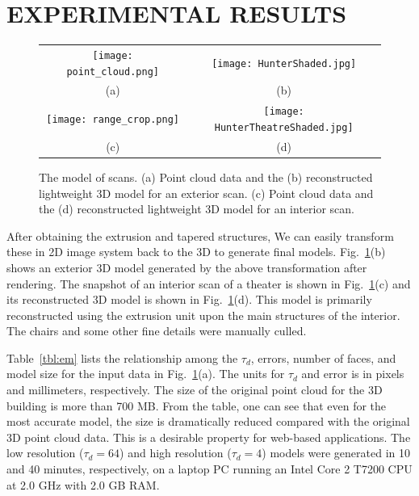 \documentclass{article}
\newcommand{\Tbl}[1]{Table~\ref{tbl:#1}}
\newcommand{\Figa}[1]{Fig.~\ref{fig:#1}(a)}
\newcommand{\Figb}[1]{Fig.~\ref{fig:#1}(b)}
\newcommand{\Figc}[1]{Fig.~\ref{fig:#1}(c)}
\newcommand{\Figd}[1]{Fig.~\ref{fig:#1}(d)}
\begin{document}
\section{EXPERIMENTAL RESULTS}
\label{sec:IR_OUT}

\begin{figure}[htbp]
\begin{center}
\begin{tabular}{cc}
\texttt{[image: point\_cloud.png]} &
\texttt{[image: HunterShaded.jpg]} \\
(a) & (b) \\
\texttt{[image: range\_crop.png]} &
\texttt{[image: HunterTheatreShaded.jpg]} \\
(c) & (d)
\end{tabular}
\end{center}
\caption{The model of scans. (a) Point cloud data and the
(b) reconstructed lightweight 3D model for an exterior scan.
(c) Point cloud data and the
(d) reconstructed lightweight 3D model for an interior scan.}
\label{fig:IN}
\end{figure}

After obtaining the extrusion and tapered structures, 
We can easily transform these in 2D image system back to the 3D to generate final models.
\Figb{IN} shows an exterior 3D model generated by the above
transformation after rendering.
The snapshot of an interior scan of a theater is shown in \Figc{IN}
and its reconstructed 3D model is shown in \Figd{IN}.
This model is primarily reconstructed using the extrusion unit
upon the main structures of the interior.
The chairs and some other fine details were manually culled.

\Tbl{em} lists the relationship among the $\tau_d$, errors,
number of faces, and model size for the input data in \Figa{IN}.
The units for $\tau_d$ and error is in pixels and millimeters, respectively.
The size of the original point cloud for the 3D building is more than 700 MB.
From the table, one can see that even for the most accurate model, the size
is dramatically reduced compared with the original 3D point cloud data.
This is a desirable property for web-based applications.
The low resolution ($\tau_d = 64$) and high resolution ($\tau_d = 4$) models
were generated in 10 and 40 minutes, respectively,
on a laptop PC running an Intel Core 2 T7200 CPU at 2.0 GHz with 2.0 GB RAM.
\end{document}
